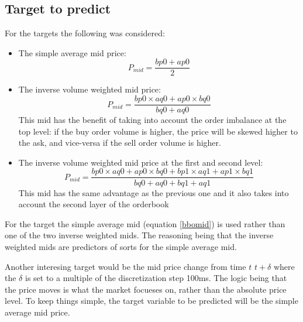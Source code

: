 \documentclass[english, 11pt, a4paper]{article}
\begin{document}
\subsection{Target to predict}
For the targets the following was considered:
\begin{itemize}
    \item The simple average mid price:
        \begin{equation}
            P_{mid} = \frac{bp0 + ap0}{2} \label{bbomid}
        \end{equation}
    \item The inverse volume weighted mid price:
        \begin{equation}
            P_{mid} = \frac{bp0\times aq0 + ap0 \times bq0}{bq0 + aq0} \label{invmid}
        \end{equation}
        This mid has the benefit of taking into account the order imbalance at the top level: if
        the buy order volume is higher, the price will be skewed higher to the ask, and vice-versa
        if the sell order volume is higher.
    \item The inverse volume weighted mid price at the first and second level:
        \begin{equation}
            P_{mid} = \frac{bp0\times aq0 + ap0 \times bq0 + bp1\times aq1 + ap1 \times bq1}{bq0 +
            aq0+bq1+aq1} \label{invmid}
        \end{equation}
        This mid has the same advantage as the previous one and it also takes into account the
        second layer of the orderbook
\end{itemize}

For the target the simple average mid (equation \ref{bbomid}) is used rather than one of the two
inverse weighted mids. The reasoning being that the inverse weighted mids are predictors of sorts for the simple average mid. 

Another interesing target would be the mid price change from time $t$  $t+\delta$ where the $\delta$
is set to a multiple of the discretization step 100ms. The logic being that the price moves is what
the market focueses on, rather than the absolute price level. To keep things simple, the target
variable to be predicted will be the simple average mid price.
\end{document}
